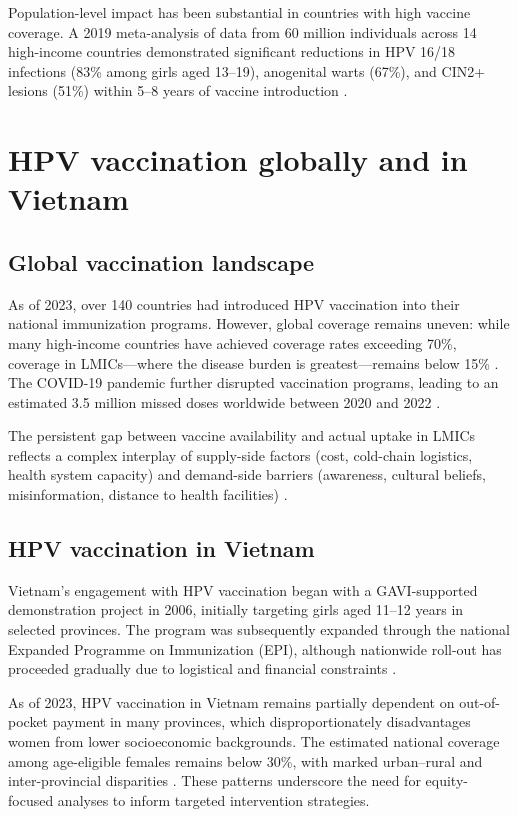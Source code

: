 Population-level impact has been substantial in countries with high vaccine coverage. A 2019 meta-analysis of data from 60 million individuals across 14 high-income countries demonstrated significant reductions in HPV 16/18 infections (83\% among girls aged 13--19), anogenital warts (67\%), and CIN2+ lesions (51\%) within 5--8 years of vaccine introduction \cite{drolet2019}.

\section{HPV vaccination globally and in Vietnam}

\subsection{Global vaccination landscape}

As of 2023, over 140 countries had introduced HPV vaccination into their national immunization programs. However, global coverage remains uneven: while many high-income countries have achieved coverage rates exceeding 70\%, coverage in LMICs---where the disease burden is greatest---remains below 15\% \cite{bruni2023}. The COVID-19 pandemic further disrupted vaccination programs, leading to an estimated 3.5 million missed doses worldwide between 2020 and 2022 \cite{who2023disruption}.

The persistent gap between vaccine availability and actual uptake in LMICs reflects a complex interplay of supply-side factors (cost, cold-chain logistics, health system capacity) and demand-side barriers (awareness, cultural beliefs, misinformation, distance to health facilities) \cite{gallagher2018}.

\subsection{HPV vaccination in Vietnam}

Vietnam's engagement with HPV vaccination began with a GAVI-supported demonstration project in 2006, initially targeting girls aged 11--12 years in selected provinces. The program was subsequently expanded through the national Expanded Programme on Immunization (EPI), although nationwide roll-out has proceeded gradually due to logistical and financial constraints \cite{nguyen2021}.

As of 2023, HPV vaccination in Vietnam remains partially dependent on out-of-pocket payment in many provinces, which disproportionately disadvantages women from lower socioeconomic backgrounds. The estimated national coverage among age-eligible females remains below 30\%, with marked urban--rural and inter-provincial disparities \cite{lamontagne2020,tran2022}. These patterns underscore the need for equity-focused analyses to inform targeted intervention strategies.

